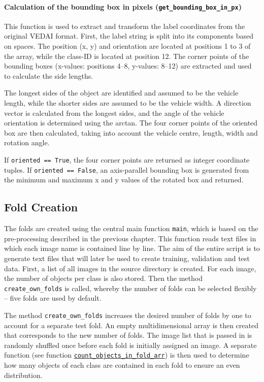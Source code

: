\paragraph{Calculation of the bounding box in pixels (\lstinline|get_bounding_box_in_px|)}

This function is used to extract and transform the label coordinates from the original \acrshort{VEDAI} format. First, the label string is split into its components based on spaces. The position (x, y) and orientation are located at positions 1 to 3 of the array, while the class-\acrshort{ID} is located at position 12. The corner points of the bounding boxes (x-values: positions 4–8, y-values: 8–12) are extracted and used to calculate the side lengths.

The longest sides of the object are identified and assumed to be the vehicle length, while the shorter sides are assumed to be the vehicle width. A direction vector is calculated from the longest sides, and the angle of the vehicle orientation is determined using the arctan. The four corner points of the oriented box are then calculated, taking into account the vehicle centre, length, width and rotation angle.

If \lstinline|oriented == True|, the four corner points are returned as integer coordinate tuples. If \lstinline|oriented == False|, an axis-parallel bounding box is generated from the minimum and maximum x and y values of the rotated box and returned.


\subsection{Fold Creation}
\label{subsec:Fold_creation}


The folds are created using the central main function \lstinline|main|, which is based on the pre-processing described in the previous chapter. This function reads text files in which each image name is contained line by line. The aim of the entire script is to generate text files that will later be used to create training, validation and test data. First, a list of all images in the source directory is created. For each image, the number of objects per class is also stored. Then the method \lstinline|create_own_folds| is called, whereby the number of folds can be selected flexibly – five folds are used by default.

The method \lstinline|create_own_folds| increases the desired number of folds by one to account for a separate test fold. An empty multidimensional array is then created that corresponds to the new number of folds. The image list that is passed in is randomly shuffled once before each fold is initially assigned an image. A separate function (see function \hyperlink{par:count_objects_in_fold_arr}{\lstinline|count_objects_in_fold_arr|}) is then used to determine how many objects of each class are contained in each fold to ensure an even distribution.

